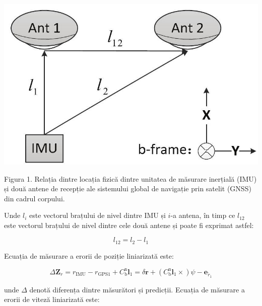 \documentclass[10pt]{report}
\begin{document}
\begin{center}
  \includegraphics[max width=\textwidth]{2023_06_04_c79b87a911fb798e1754g-2}
\end{center}

Figura 1. Relația dintre locația fizică dintre unitatea de măsurare inerțială (IMU) și două antene de recepție ale sistemului global de navigație prin satelit (GNSS) din cadrul corpului.

Unde $l_{i}$ este vectorul brațului de nivel dintre IMU și $i$-a antena, în timp ce $l_{12}$ este vectorul brațului de nivel dintre cele două antene și poate fi exprimat astfel:

\begin{equation}
  l_{12}=l_{2}-l_{1}
\end{equation}


Ecuația de măsurare a erorii de poziție liniarizată este:

\begin{equation}
  \Delta \mathbf{Z}_{r}=r_{\mathrm{IMU}}-r_{\mathrm{GPS} 1}+C_{\mathrm{b}}^{\mathrm{n}} \boldsymbol{l}_{1}=\delta \boldsymbol{r}+\left(C_{\mathrm{b}}^{\mathrm{n}} \boldsymbol{l}_{1} \times\right) \psi-\boldsymbol{e}_{\widetilde{r}_{1}}
\end{equation}


unde $\Delta$ denotă diferența dintre măsurători și predicții. Ecuația de măsurare a erorii de viteză liniarizată este:
\end{document}
